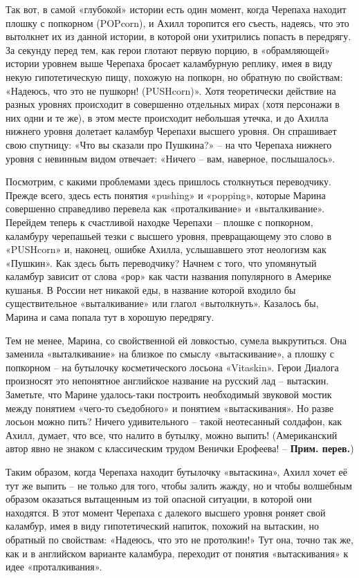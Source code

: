 \documentclass[../main.tex]{subfiles}
\begin{document}
Так вот, в самой «глубокой» истории есть один момент, когда Черепаха находит плошку с попкорном (POPcorn), и Ахилл торопится его съесть, надеясь, что это вытолкнет их из данной истории, в которой они ухитрились попасть в передрягу.
За секунду перед тем, как герои глотают первую порцию, в «обрамляющей» истории уровнем выше Черепаха бросает каламбурную реплику, имея в виду некую гипотетическую пищу, похожую на попкорн, но обратную по свойствам: «Надеюсь, что это не пушкорн! (PUSHcorn)».
Хотя теоретически действие на разных уровнях происходит в совершенно отдельных мирах (хотя персонажи в них одни и те же), в этом месте происходит небольшая утечка, и до Ахилла нижнего уровня долетает каламбур Черепахи высшего уровня.
Он спрашивает свою спутницу: «Что вы сказали про Пушкина?» \--- на что Черепаха нижнего уровня с невинным видом отвечает: «Ничего \--- вам, наверное, послышалось».

Посмотрим, с какими проблемами здесь пришлось столкнуться переводчику.
Прежде всего, здесь есть понятия «pushing» и «popping», которые Марина совершенно справедливо перевела как «проталкивание» и «выталкивание».
Перейдем теперь к счастливой находке Черепахи \--- плошке с попкорном, каламбуру черепашьей тезки с высшего уровня, превращающему это слово в «PUSHcorn» и, наконец, ошибке Ахилла, услышавшего этот неологизм как «Пушкин».
Как здесь быть переводчику?
Начнем с того, что упомянутый каламбур зависит от слова «рор» как части названия популярного в Америке кушанья.
В России нет никакой еды, в название которой входило бы существительное «выталкивание» или глагол «вытолкнуть».
Казалось бы, Марина и сама попала тут в хорошую передрягу.

Тем не менее, Марина, со свойственной ей ловкостью, сумела выкрутиться.
Она заменила «выталкивание» на близкое по смыслу «вытаскивание», а плошку с попкорном \--- на бутылочку косметического лосьона «Vitaskin».
Герои Диалога произносят это непонятное английское название на русский лад \--- вытаскин.
Заметьте, что Марине удалось-таки построить необходимый звуковой мостик между понятием «чего-то съедобного» и понятием «вытаскивания».
Но разве лосьон можно пить?
Ничего удивительного \--- такой неотесанный солдафон, как Ахилл, думает, что все, что налито в бутылку, можно выпить! (Американский автор явно не знаком с классическим трудом Венички Ерофеева! \--- \textbf{Прим.
перев.})

Таким образом, когда Черепаха находит бутылочку «вытаскина», Ахилл хочет её тут же выпить \--- не только для того, чтобы залить жажду, но и чтобы волшебным образом оказаться вытащенным из той опасной ситуации, в которой они находятся.
В этот момент Черепаха с далекого высшего уровня роняет свой каламбур, имея в виду гипотетический напиток, похожий на вытаскин, но обратный по свойствам: «Надеюсь, что это не протолкин!» Тут она, точно так же, как и в английском варианте каламбура, переходит от понятия «вытаскивания» к идее «проталкивания».
\end{document}
